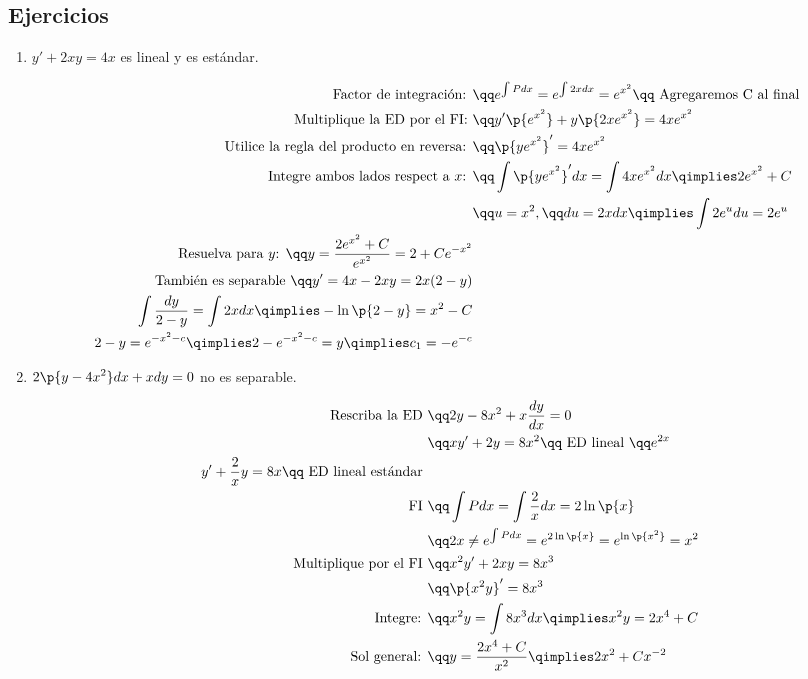\subsection{Ejercicios}
\begin{enumerate}
    \item $\displaystyle y'+2xy=4x$  es lineal y es estándar.
        \begin{center}
           \begin{align*}
               \text{ Factor de integración: } &\qq e^{\int Pdx} = e^{\int 2xdx} = e^{x^2} \qq \text{ Agregaremos C al final } \\
               \text{ Multiplique la ED por el FI: } &\qq y'\p{e^{x^2}}  + y\p{2xe^{x^2}}  = 4xe^{x^2} \\ 
               \text{ Utilice la regla del producto en reversa: } &\qq \p{ye^{x^2}}' = 4xe^{x^2} \\ 
               \text{ Integre ambos lados respect a $x$: } &\qq \int\p{ye^{x^2}}'dx = \int 4xe^{x^2} dx \qimplies 2e^{x^2}+C \\ 
               &\qq u = x^2, \qq du = 2xdx \qimplies \int 2e^udu=2e^u \\ 
               \text{ Resuelva para $y$: } \qq y = \frac{2e^{x^2}+C}{e^{x^2}} = 2+Ce^{-x^2} \\ \text{ También es separable } \qq y'=4x-2xy=2x(2-y) \\ 
                \int \frac{dy}{2-y}=\int 2x dx \qimplies -\ln\p{ 2-y } =x^2-C \\ 2-y=e^{-x^2-c} \qimplies 2-e^{-x^2-c} = y \qimplies c_1 = -e^{-c} \\ 
           \end{align*}
        \end{center}
    
    \item $\displaystyle 2\p{y-4x^2} dx+xdy=0$ no es separable.
        \begin{center}
           \begin{align*}
               \text{ Rescriba la ED } &\qq 2y-8x^2+x \frac{d y}{d x} = 0 \\ 
               &\qq xy'+2y=8x^2 \qq \text{ ED lineal } \qq e^{2x} \\ 
               y'+\frac{2}{x}y  =8x \qq \text{ ED lineal estándar } \\ 
               \text{ FI }&\qq \int Pdx=\int \frac{2}{x}dx  = 2\ln\p{ x } \\ 
               &\qq 2x \neq e^{\int Pdx}  = e^{2\ln\p{ x } }= e^{\ln\p{ x^2 }  } = x^2 \\ 
               \text{ Multiplique por el FI } &\qq x^2y'+2xy=8x^3 \\ 
               &\qq \p{x^2y}' = 8x^3 \\ 
               \text{ Integre: } &\qq x^2y=\int 8x^3 dx \qimplies x^2y = 2x^4+C \\ 
               \text{ Sol general: } &\qq y = \frac{2x^4+C}{x^2} \qimplies 2x^2+Cx^{-2} \\ 
           \end{align*}
        \end{center}
    

\end{enumerate}
